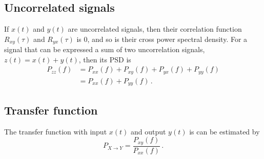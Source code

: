 \subsection{Uncorrelated signals}
If $x(t)$ and $y(t)$ are uncorrelated signals, then their correlation function $R_{xy}(\tau)$ and $R_{yx}(\tau)$ is 0, and so is their cross power spectral density.
For a signal that can be expressed a sum of two uncorrelation signals, $z(t)=x(t)+y(t)$, then its PSD is
\begin{equation}
	\begin{split}
		P_{zz}(f) &= P_{xx}(f) + P_{xy}(f) + P_{yx}(f) + P_{yy}(f)\\
		&= P_{xx}(f) + P_{yy}(f)\,.
	\end{split}
\end{equation}

\subsection{Transfer function}
The transfer function with input $x(t)$ and output $y(t)$ is can be estimated by
\begin{equation}
	P_{X\to Y} = \frac{P_{xy}(f)}{P_{xx}(f)}\,.
\end{equation}